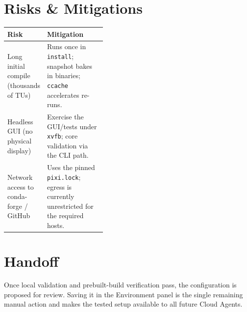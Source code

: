 \documentclass[11pt]{article}
\begin{document}
\section{Risks \& Mitigations}
\noindent\begin{tabularx}{\linewidth}{@{}p{0.40\linewidth}L@{}}
\toprule
\textbf{Risk} & \textbf{Mitigation} \\
\midrule
Long initial compile (thousands of TUs) & Runs once in \texttt{install}; snapshot bakes in binaries; \texttt{ccache} accelerates re-runs. \\
Headless GUI (no physical display) & Exercise the GUI/tests under \texttt{xvfb}; core validation via the CLI path. \\
Network access to conda-forge / GitHub & Uses the pinned \texttt{pixi.lock}; egress is currently unrestricted for the required hosts. \\
\bottomrule
\end{tabularx}

\section{Handoff}
Once local validation and prebuilt-build verification pass, the configuration is
proposed for review. Saving it in the Environment panel is the single remaining
manual action and makes the tested setup available to all future Cloud Agents.
\end{document}
